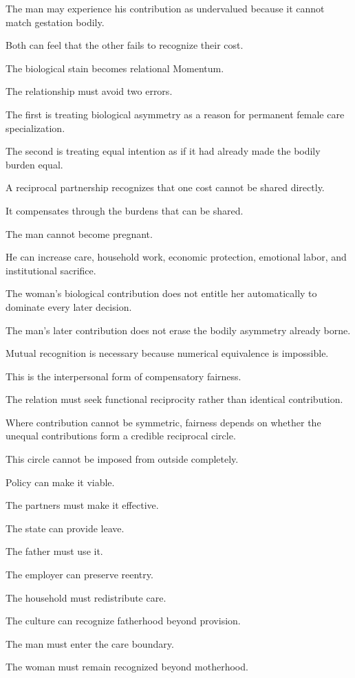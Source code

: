 The man may experience his contribution as undervalued because it cannot match gestation bodily.

Both can feel that the other fails to recognize their cost.

The biological stain becomes relational Momentum.

The relationship must avoid two errors.

The first is treating biological asymmetry as a reason for permanent female care specialization.

The second is treating equal intention as if it had already made the bodily burden equal.

A reciprocal partnership recognizes that one cost cannot be shared directly.

It compensates through the burdens that can be shared.

The man cannot become pregnant.

He can increase care, household work, economic protection, emotional labor, and institutional sacrifice.

The woman’s biological contribution does not entitle her automatically to dominate every later decision.

The man’s later contribution does not erase the bodily asymmetry already borne.

Mutual recognition is necessary because numerical equivalence is impossible.

This is the interpersonal form of compensatory fairness.

The relation must seek functional reciprocity rather than identical contribution.

Where contribution cannot be symmetric, fairness depends on whether the unequal contributions form a credible reciprocal circle.

This circle cannot be imposed from outside completely.

Policy can make it viable.

The partners must make it effective.

The state can provide leave.

The father must use it.

The employer can preserve reentry.

The household must redistribute care.

The culture can recognize fatherhood beyond provision.

The man must enter the care boundary.

The woman must remain recognized beyond motherhood.

